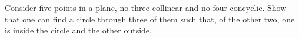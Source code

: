 Consider five points in a plane, no three collinear and no four concyclic. Show that one can find a circle through three of them such that, of the other two, one is inside the circle and the other outside.

